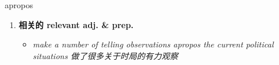 
\begin{frame}
{\huge apropos}
\begin{center}
\begin{enumerate}\Large
  \item \textbf{相关的 relevant adj. \& prep.}
  \begin{itemize}
    \item \em{\Large{make a number of telling observations apropos the current political situations 做了很多关于时局的有力观察}}
  \end{itemize}
\end{enumerate}
\end{center}
\end{frame}
